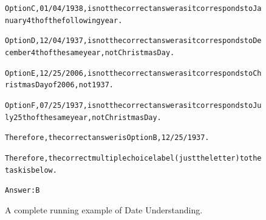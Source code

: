 \begin{figure}[t]
{{\begin{alltt}
Option C, 01/04/1938, is not the correct answer as it corresponds to January 4th of the following year.

Option D, 12/04/1937, is not the correct answer as it corresponds to December 4th of the same year, not Christmas Day.

Option E, 12/25/2006, is not the correct answer as it corresponds to Christmas Day of 2006, not 1937.

Option F, 07/25/1937, is not the correct answer as it corresponds to July 25th of the same year, not Christmas Day.

Therefore, the correct answer is Option B, 12/25/1937.

Therefore, the correct multiple choice label (just the letter) to the task is below.

Answer: B
\end{alltt}
}}
\caption{A complete running example of Date Understanding.}
\label{fig:date_understanding_example}
\end{figure}
